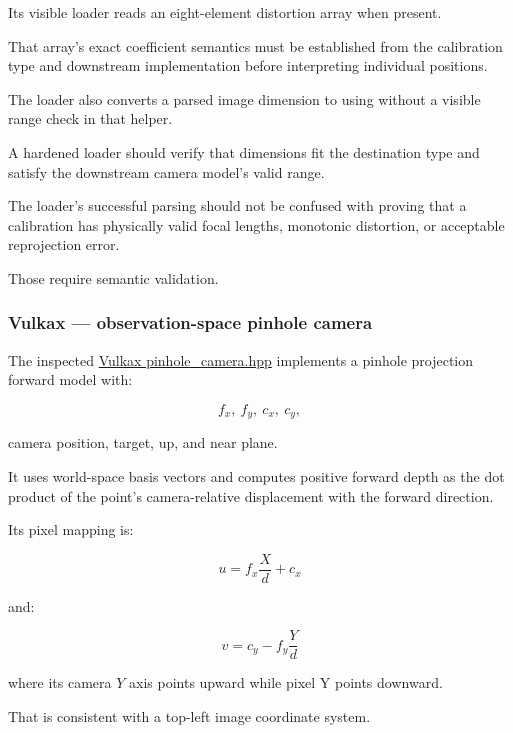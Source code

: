 Its visible loader reads an eight-element distortion array when present.

That array's exact coefficient semantics must be established from the calibration type and downstream implementation before interpreting individual positions.

The loader also converts a parsed  image dimension to  using  without a visible range check in that helper.

A hardened loader should verify that dimensions fit the destination type and satisfy the downstream camera model's valid range.

The loader's successful parsing should not be confused with proving that a calibration has physically valid focal lengths, monotonic distortion, or acceptable reprojection error.

Those require semantic validation.

\subsubsection{Vulkax --- observation-space pinhole camera}\label{02-foundations-ii-ch037-vulkax-observation-space-pinhole-camera}

\hypertarget{02-foundations-ii-ch037-vulkax-observation-space-pinhole-camera}{}

The inspected \href{https://github.com/swayam8624/Vulkax/blob/main/include/vulkax/world/pinhole_camera.hpp?utm_source=chatgpt.com}{Vulkax pinhole\_camera.hpp} implements a pinhole projection forward model with:

\[
 f_x,\ f_y,\ c_x,\ c_y,
\]

camera position, target, up, and near plane.

It uses world-space basis vectors and computes positive forward depth as the dot product of the point's camera-relative displacement with the forward direction.

Its pixel mapping is:

\[
 \boxed{ u=f_x\frac{X}{d}+c_x }
\]

and:

\[
 \boxed{ v=c_y-f_y\frac{Y}{d} }
\]

where its camera \(Y\) axis points upward while pixel Y points downward.

That is consistent with a top-left image coordinate system.

